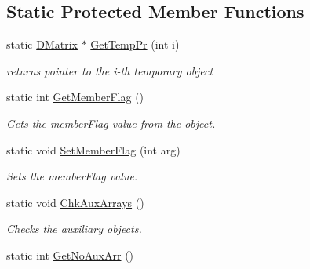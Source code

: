 \subsection*{Static Protected Member Functions}
\begin{DoxyCompactItemize}
\item 
\hypertarget{classDMatrix_a219884cf7cdede14bf16b1e2f72b8519}{
static \hyperlink{classDMatrix}{DMatrix} $\ast$ \hyperlink{classDMatrix_a219884cf7cdede14bf16b1e2f72b8519}{GetTempPr} (int i)}
\label{classDMatrix_a219884cf7cdede14bf16b1e2f72b8519}

\begin{DoxyCompactList}\small\item\em returns pointer to the i-\/th temporary object \item\end{DoxyCompactList}\item 
\hypertarget{classDMatrix_acd872a02e93bdabb985544e6f2dfcce5}{
static int \hyperlink{classDMatrix_acd872a02e93bdabb985544e6f2dfcce5}{GetMemberFlag} ()}
\label{classDMatrix_acd872a02e93bdabb985544e6f2dfcce5}

\begin{DoxyCompactList}\small\item\em Gets the memberFlag value from the object. \item\end{DoxyCompactList}\item 
\hypertarget{classDMatrix_a720e5aedc8031aa796b2f176a3baafff}{
static void \hyperlink{classDMatrix_a720e5aedc8031aa796b2f176a3baafff}{SetMemberFlag} (int arg)}
\label{classDMatrix_a720e5aedc8031aa796b2f176a3baafff}

\begin{DoxyCompactList}\small\item\em Sets the memberFlag value. \item\end{DoxyCompactList}\item 
\hypertarget{classDMatrix_a627d51c532b05cff96fe700d403935d1}{
static void \hyperlink{classDMatrix_a627d51c532b05cff96fe700d403935d1}{ChkAuxArrays} ()}
\label{classDMatrix_a627d51c532b05cff96fe700d403935d1}

\begin{DoxyCompactList}\small\item\em Checks the auxiliary objects. \item\end{DoxyCompactList}\item 
\hypertarget{classDMatrix_a0c91bf06a776242d7d6ad0a7542f6941}{
static int \hyperlink{classDMatrix_a0c91bf06a776242d7d6ad0a7542f6941}{GetNoAuxArr} ()}
\label{classDMatrix_a0c91bf06a776242d7d6ad0a7542f6941}


\end{DoxyCompactItemize}
